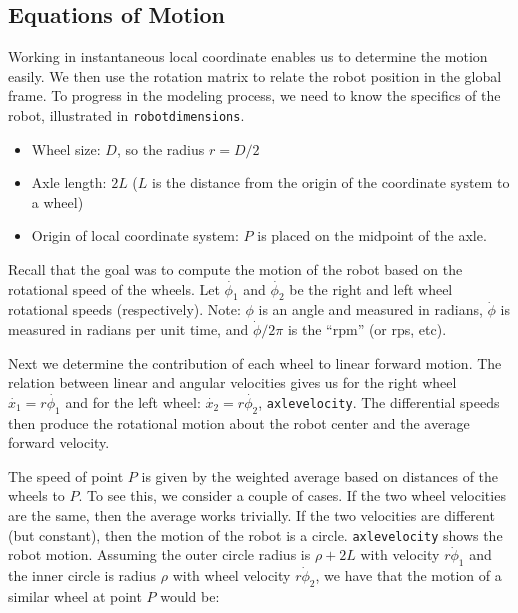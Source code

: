 \hypertarget{equations-of-motion}{%
\subsection{Equations of Motion}\label{equations-of-motion}}

Working in instantaneous local coordinate enables us to determine the
motion easily. We then use the rotation matrix to relate the robot
position in the global frame. To progress in the modeling process, we
need to know the specifics of the robot, illustrated in
\texttt{robotdimensions}.

\begin{itemize}
\tightlist
\item
  Wheel size: \(D\), so the radius \(r = D/2\)
\item
  Axle length: \(2L\) (\(L\) is the distance from the origin of the
  coordinate system to a wheel)
\item
  Origin of local coordinate system: \(P\) is placed on the midpoint of
  the axle.
\end{itemize}

Recall that the goal was to compute the motion of the robot based on the
rotational speed of the wheels. Let \(\dot{\phi_1}\) and
\(\dot{\phi_2}\) be the right and left wheel rotational speeds
(respectively). Note: \(\phi\) is an angle and measured in radians,
\(\dot{\phi}\) is measured in radians per unit time, and
\(\dot{\phi}/2\pi\) is the ``rpm'' (or rps, etc).

Next we determine the contribution of each wheel to linear forward
motion. The relation between linear and angular velocities gives us for
the right wheel \(\dot{x_1} = r\dot{\phi_1}\) and for the left wheel:
\(\dot{x_2} = r\dot{\phi_2}\), \texttt{axlevelocity}. The differential
speeds then produce the rotational motion about the robot center and the
average forward velocity.

The speed of point \(P\) is given by the weighted average based on
distances of the wheels to \(P\). To see this, we consider a couple of
cases. If the two wheel velocities are the same, then the average works
trivially. If the two velocities are different (but constant), then the
motion of the robot is a circle. \texttt{axlevelocity} shows the robot
motion. Assuming the outer circle radius is \(\rho + 2L\) with velocity
\(r\dot{\phi}_1\) and the inner circle is radius \(\rho\) with wheel
velocity \(r\dot{\phi}_2\), we have that the motion of a similar wheel
at point \(P\) would be:

